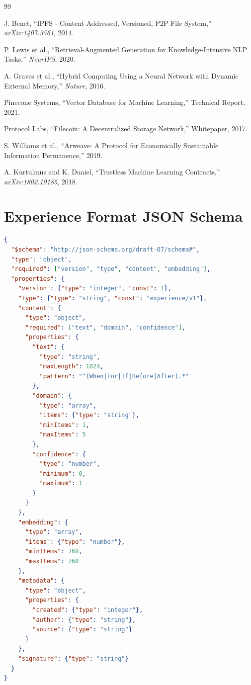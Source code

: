 \documentclass[11pt,letterpaper]{article}
\begin{document}

\begin{thebibliography}{99}

J. Benet, ``IPFS - Content Addressed, Versioned, P2P File System,'' \textit{arXiv:1407.3561}, 2014.

P. Lewis et al., ``Retrieval-Augmented Generation for Knowledge-Intensive NLP Tasks,'' \textit{NeurIPS}, 2020.

A. Graves et al., ``Hybrid Computing Using a Neural Network with Dynamic External Memory,'' \textit{Nature}, 2016.

Pinecone Systems, ``Vector Database for Machine Learning,'' Technical Report, 2021.

Protocol Labs, ``Filecoin: A Decentralized Storage Network,'' Whitepaper, 2017.

S. Williams et al., ``Arweave: A Protocol for Economically Sustainable Information Permanence,'' 2019.

A. Kurtulmus and K. Daniel, ``Trustless Machine Learning Contracts,'' \textit{arXiv:1802.10185}, 2018.

\end{thebibliography}

\appendix

\section{Experience Format JSON Schema}

\begin{lstlisting}[language=json,caption=Complete JSON Schema]
{
  "$schema": "http://json-schema.org/draft-07/schema#",
  "type": "object",
  "required": ["version", "type", "content", "embedding"],
  "properties": {
    "version": {"type": "integer", "const": 1},
    "type": {"type": "string", "const": "experience/v1"},
    "content": {
      "type": "object",
      "required": ["text", "domain", "confidence"],
      "properties": {
        "text": {
          "type": "string",
          "maxLength": 1024,
          "pattern": "^(When|For|If|Before|After).*"
        },
        "domain": {
          "type": "array",
          "items": {"type": "string"},
          "minItems": 1,
          "maxItems": 5
        },
        "confidence": {
          "type": "number",
          "minimum": 0,
          "maximum": 1
        }
      }
    },
    "embedding": {
      "type": "array",
      "items": {"type": "number"},
      "minItems": 768,
      "maxItems": 768
    },
    "metadata": {
      "type": "object",
      "properties": {
        "created": {"type": "integer"},
        "author": {"type": "string"},
        "source": {"type": "string"}
      }
    },
    "signature": {"type": "string"}
  }
}
\end{lstlisting}
\end{document}
